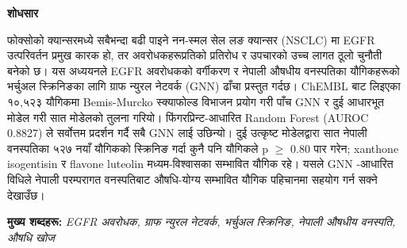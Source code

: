 
\cleardoublepage

\begin{center}
  {\fontsize{18}{22}\selectfont\bfseries{\nepalifont शोधसार}}
\end{center}
\thispagestyle{plain}

\vspace{1cm}

{\fontsize{12}{18}\selectfont

{\nepalifont फोक्सोको क्यान्सरमध्ये सबैभन्दा बढी पाइने नन-स्मल सेल
लङ क्यान्सर}
(NSCLC)
{\nepalifont मा}
EGFR
{\nepalifont उत्परिवर्तन प्रमुख कारक हो, तर अवरोधकहरूप्रतिको प्रतिरोध
र उपचारको उच्च लागत ठूलो चुनौती बनेको छ। यस अध्ययनले}
EGFR
{\nepalifont अवरोधकको वर्गीकरण र नेपाली औषधीय वनस्पतिका यौगिकहरूको
भर्चुअल स्क्रिनिङका लागि ग्राफ न्युरल नेटवर्क}
(GNN)
{\nepalifont ढाँचा प्रस्तुत गर्दछ।}
ChEMBL
{\nepalifont बाट लिइएका १०,५२३ यौगिकमा}
Bemis-Murcko
{\nepalifont स्क्याफोल्ड विभाजन प्रयोग गरी पाँच}
GNN
{\nepalifont र दुई आधारभूत मोडेल गरी सात मोडेलको तुलना गरियो।
फिंगरप्रिन्ट-आधारित}
Random Forest
(AUROC 0.8827)
{\nepalifont ले सर्वोत्तम प्रदर्शन गर्दै सबै}
GNN
{\nepalifont लाई उछिन्यो। दुई उत्कृष्ट मोडेलद्वारा सात नेपाली
वनस्पतिका ५२७ नयाँ यौगिकको स्क्रिनिङ गर्दा कुनै पनि यौगिकले}
p $\geq$ 0.80
{\nepalifont पार गरेन;}
xanthone isogentisin
{\nepalifont र}
flavone luteolin
{\nepalifont मध्यम-विश्वासका सम्भावित यौगिक रहे। यसले}
GNN
{\nepalifont-आधारित विधिले नेपाली परम्परागत वनस्पतिबाट औषधि-योग्य
सम्भावित यौगिक पहिचानमा सहयोग गर्न सक्ने देखाउँछ।}

} %

\vspace{0.8cm}

\noindent
{\fontsize{10}{12}\selectfont
{\nepalifont\textbf{मुख्य शब्दहरू:}}
\textit{EGFR {\nepalifont अवरोधक}, {\nepalifont ग्राफ न्युरल नेटवर्क},
{\nepalifont भर्चुअल स्क्रिनिङ}, {\nepalifont नेपाली औषधीय वनस्पति},
{\nepalifont औषधि खोज}}}